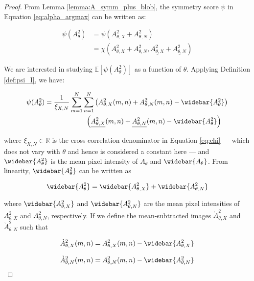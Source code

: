 \begin{proof}
    From Lemma \ref{lemma:A_symm_plus_blob}, the symmetry score $\psi$ in Equation \ref{eq:alpha_argmax} can be written as:

    \begin{align}
        \psi(A^2_\theta) &= \psi(A^2_{\theta,X} + A^2_{\theta,N})\\
        &= \chi(A^2_{\theta,X} + A^2_{\theta,N},\underline{A^2_{\theta,X}} + \underline{A^2_{\theta,N}}) \label{eq:psi_2}
    \end{align}
    
    We are interested in studying $\mathbb{E}\left[\psi(A^2_\theta)\right]$ as a function of $\theta$. Applying Definition \ref{def:psi_I}, we have:

    \begin{align}
    \label{eq:psi_A^2_theta}
        \psi(A^2_\theta) &= \dfrac{1}{\xi_{X,N}} \sum_{m=1}^N \sum_{n=1}^N \left(A^2_{\theta,X}(m,n) + A^2_{\theta,N}(m,n) - \widebar{A_\theta^2} \right) \nonumber \\ 
        & \quad\quad\quad\quad\quad\quad \left( \underline{A^2_{\theta,X}}(m,n) + \underline{A^2_{\theta,N}}(m,n) - \widebar{A_\theta^2} \right)
    \end{align}

    where $\xi_{X,N} \in \mathbb{R}$ is the cross-correlation denominator in Equation \ref{eq:chi} --- which does not vary with $\theta$ and hence is considered a constant here --- and $\widebar{A_\theta^2}$ is the mean pixel intensity of $A_\theta$ and $\widebar{A_\theta}$. From linearity, $\widebar{A_\theta^2}$ can be written as

    \begin{equation}
        \widebar{A_\theta^2} = \widebar{A_{\theta,X}^2} + \widebar{A_{\theta,N}^2}
    \end{equation}
    
    where $\widebar{A_{\theta,X}^2}$ and $\widebar{A_{\theta,N}^2}$ are the mean pixel intensities of $A_{\theta,X}^2$ and $A_{\theta,N}^2$, respectively. If we define the mean-subtracted images $\grave{A}^2_{\theta,X}$ and $\grave{A}^2_{\theta,N}$ such that
    
        \begin{equation}
        \grave{A}^2_{\theta,X}(m,n) =  A^2_{\theta,X}(m,n) - \widebar{A_{\theta,X}^2}
    \end{equation}

    \begin{equation}
        \grave{A}^2_{\theta,N}(m,n) =  A^2_{\theta,N}(m,n) - \widebar{A_{\theta,N}^2}
    \end{equation}
    

\end{proof}
